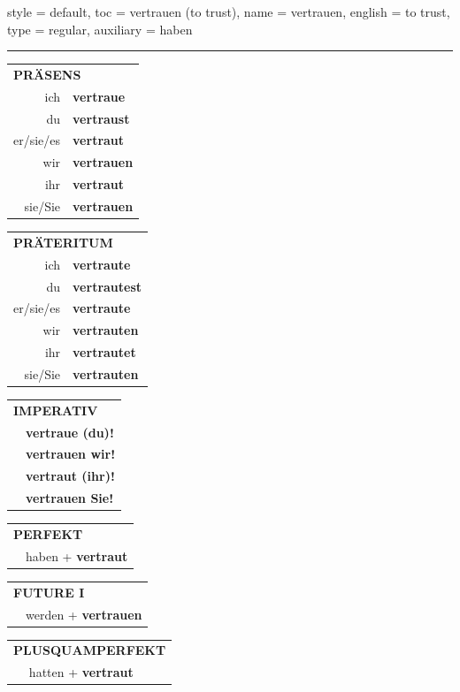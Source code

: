 \begin{verbentry}{
  style = {default},
  toc = {vertrauen (to trust)},
  name = {vertrauen},
  english = {to trust},
  type = {regular},
  auxiliary = {haben}
}


\vspace{5pt}
\hrule
\vspace{5pt}

\begin{tabular}{rl}
\multicolumn{2}{l}{\textbf{PRÄSENS}}\\
ich & \textbf{vertraue}\\
du & \textbf{vertraust}\\
er/sie/es & \textbf{vertraut}\\
wir & \textbf{vertrauen}\\
ihr & \textbf{vertraut}\\
sie/Sie & \textbf{vertrauen}\\
\end{tabular}
\hfill
\begin{tabular}{rl}
\multicolumn{2}{l}{\textbf{PRÄTERITUM}}\\
ich & \textbf{vertraute}\\
du & \textbf{vertrautest}\\
er/sie/es & \textbf{vertraute}\\
wir & \textbf{vertrauten}\\
ihr & \textbf{vertrautet}\\
sie/Sie & \textbf{vertrauten}\\
\end{tabular}
\hfill
\begin{tabular}{rl}
\multicolumn{2}{l}{\textbf{IMPERATIV}}\\
& \textbf{vertraue (du)!}\\
& \textbf{vertrauen wir!}\\
& \textbf{vertraut (ihr)!}\\
& \textbf{vertrauen Sie!}\\
\end{tabular}

\vspace{10pt}

\begin{tabular}{rl}
\multicolumn{2}{l}{\textbf{PERFEKT}}\\
& haben + \textbf{vertraut}\\
\end{tabular}
\hfill
\begin{tabular}{rl}
\multicolumn{2}{l}{\textbf{FUTURE I}}\\
& werden + \textbf{vertrauen}\\
\end{tabular}
\hfill
\begin{tabular}{rl}
\multicolumn{2}{l}{\textbf{PLUSQUAMPERFEKT}}\\
& hatten + \textbf{vertraut}\\
\end{tabular}


\end{verbentry}
